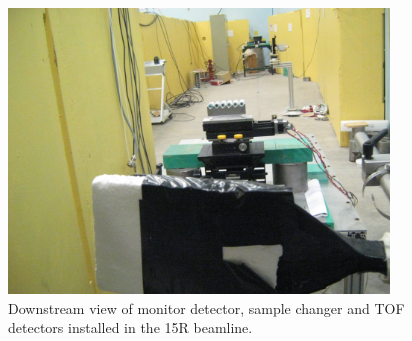 \begin{figure}[tb]
    \centering
    \includegraphics[width=0.9\textwidth]{figures/DownstreamFromMonitor.jpg}
    \caption[Monitor detector, sample changer, and TOF detector]
    {
        Downstream view of monitor detector, sample changer and TOF detectors
        installed in the 15R beamline.
    }
    \label{BeamlineDownstream}
\end{figure}
